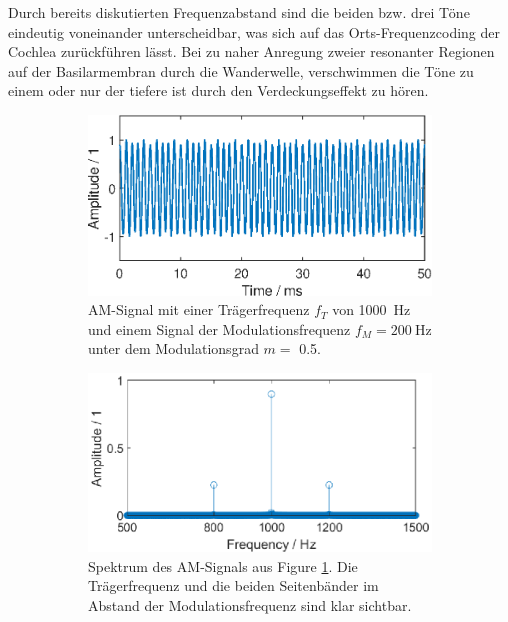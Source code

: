 Durch bereits diskutierten Frequenzabstand sind die beiden bzw. drei Töne eindeutig voneinander unterscheidbar, was sich auf das Orts-Frequenzcoding der Cochlea zurückführen lässt. Bei zu naher Anregung zweier resonanter Regionen auf der Basilarmembran durch die Wanderwelle, verschwimmen die Töne zu einem oder nur der tiefere ist durch den Verdeckungseffekt zu hören.
\begin{figure}[h]
    \centering
\begin{subfigure}{.49\textwidth} 
  \centering
  \includegraphics[width=.9\linewidth]{ue4/AM_1000_200.eps} %
  \caption{AM-Signal mit einer Trägerfrequenz $f_T$ von \SI{1000}{\Hz} und einem Signal der Modulationsfrequenz $f_M =  \SI{200}{\Hz}$ unter dem Modulationsgrad $m =$ 0.5.}
  \label{fig:AM_1000_200}
  \end{subfigure}%
\hfill
\begin{subfigure}{.49\textwidth} 
  \centering
  \includegraphics[width=\linewidth]{ue4/AM_1000_200_fft.eps} %
  \caption{Spektrum des AM-Signals aus Figure \ref{fig:AM_1000_200}. Die Trägerfrequenz und die beiden Seitenbänder im Abstand der Modulationsfrequenz sind klar sichtbar.}
  \label{fig:AM_1000_200_fft}
\end{subfigure}
    \caption{}
    \label{fig:AM_1000_200_fig}
\end{figure}


